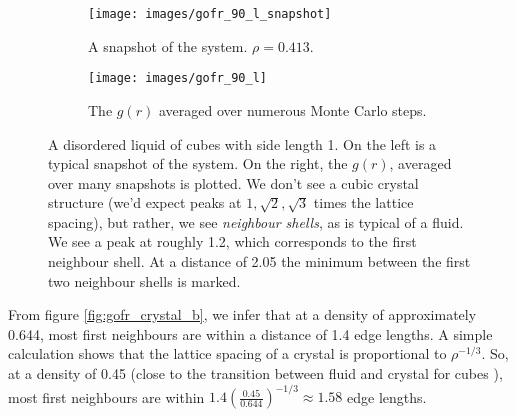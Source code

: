 \documentclass[thesis]{subfiles}
\begin{document}
\begin{figure}[H]
	\centering
	\vspace{-8pt}
\begin{subfigure}{0.3\textwidth}
	\centering
	\vspace{8pt}
	\texttt{[image: images/gofr\_90\_l\_snapshot]}
	\vspace{10pt}
	\caption{A snapshot of the system. $\rho = 0.413$.}
\end{subfigure}
\begin{subfigure}{0.5\textwidth}
	\centering
	\texttt{[image: images/gofr\_90\_l]}
	\caption{The $g(r)$ averaged over numerous Monte Carlo steps.}
\end{subfigure}
\caption{A disordered liquid of cubes with side length 1. On the left is a typical snapshot of the system. On the right, the $g(r)$, averaged over many snapshots is plotted. We don't see a cubic crystal structure (we'd expect peaks at $1, \sqrt 2, \sqrt 3$ times the lattice spacing), but rather, we see \emph{neighbour shells}, as is typical of a fluid. We see a peak at roughly 1.2, which corresponds to the first neighbour shell. At a distance of 2.05 the minimum between the first two neighbour shells is marked.}
\end{figure}
From figure \ref{fig:gofr_crystal_b}, we infer that at a density of approximately 0.644, most first neighbours are within a distance of 1.4 edge lengths. A simple calculation shows  that the lattice spacing of a crystal is proportional to $\rho^{-1/3}$. So, at a density of 0.45 (close to the transition between fluid and crystal for cubes \cite{van2017phase}), most first neighbours are within $1.4 \left( \frac{0.45}{0.644}\right)^{-1/3} \approx 1.58$ edge lengths. 
\end{document}
